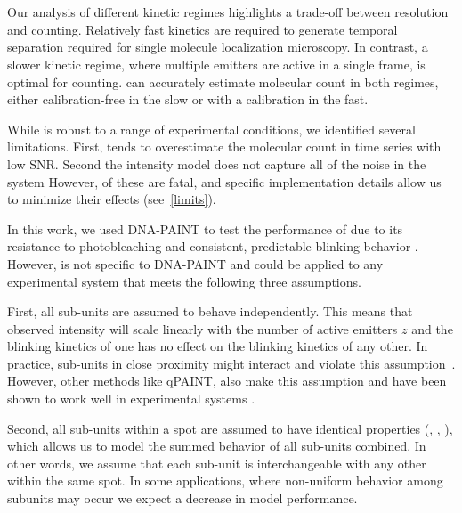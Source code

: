 \section{} \label{discussion}

Our analysis of different kinetic regimes highlights a trade-off 
between resolution and counting.
  Relatively fast kinetics are required to generate temporal separation required for single 
  molecule localization microscopy.
  In contrast, a slower kinetic regime, where multiple emitters are active in a single frame, 
  is optimal for counting.
  \ours can accurately estimate molecular count in both regimes, either calibration-free in the slow 
  or with a calibration in the fast.

While \ours is robust to a range of experimental conditions, 
we identified several limitations.
  First, \ours tends to overestimate the molecular
  count in time series with low SNR.
  Second the intensity model does not capture all of the noise
  in the system 
  However,  of these are fatal, and specific implementation details 
  allow us to minimize their effects (see~\ref{limits}).

In this work, we used DNA-PAINT to test the performance of \ours 
due to its resistance to photobleaching and consistent, 
predictable blinking behavior .
  However, \ours is not specific to DNA-PAINT and could be 
  applied to any experimental system that meets the following three assumptions.

  First, all sub-units are assumed to behave independently.
  This means that observed intensity will scale
  linearly with the number of active emitters $z$ and 
  the blinking kinetics of one 
  has no effect on the blinking kinetics of any other.
  In practice, sub-units in close proximity might 
  interact and violate this assumption~\citep{helmerich_photoswitching_2022}. 
  However, other methods like qPAINT, also make this assumption and have been shown to
  work well in experimental systems \citep{fischer_quantitative_2021,
  jayasinghe_true_2018}. 

  Second, all sub-units within a spot are assumed to have identical properties 
  (\pon, \poff, \re), which allows us to model the summed behavior of all sub-units combined.
  In other words, we assume that each sub-unit is
  interchangeable with any other within the same spot.
  In some applications, where non-uniform behavior among subunits may occur 
  we expect a decrease in model performance.


